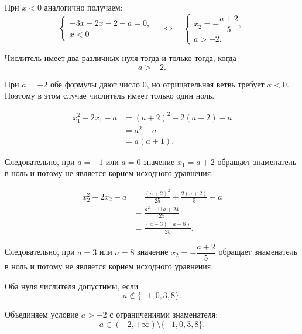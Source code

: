 При \(x<0\) аналогично получаем:
\[
  \begin{cases}
    -3x-2x-2-a=0,\\
    x<0
  \end{cases}
  \quad\Longleftrightarrow\quad
  \begin{cases}
    x_2=-\dfrac{a+2}{5},\\
    a>-2.
  \end{cases}
\]

\begin{conclusionbox}
  Числитель имеет два различных нуля тогда и только тогда, когда
  \[
    \boxed{a>-2}.
  \]
\end{conclusionbox}

\begin{notebox}
  При \(a=-2\) обе формулы дают число \(0\), но отрицательная ветвь требует
  \(x<0\). Поэтому в этом случае числитель имеет только один ноль.
\end{notebox}


\begin{align*}
  x_1^2-2x_1-a
  &=(a+2)^2-2(a+2)-a\\
  &=a^2+a\\
  &=a(a+1).
\end{align*}

Следовательно, при \(a=-1\) или \(a=0\) значение
\(x_1=a+2\) обращает знаменатель в ноль и потому не является корнем
исходного уравнения.


\begin{align*}
  x_2^2-2x_2-a
  &=\frac{(a+2)^2}{25}+\frac{2(a+2)}{5}-a\\
  &=\frac{a^2-11a+24}{25}\\
  &=\frac{(a-3)(a-8)}{25}.
\end{align*}

Следовательно, при \(a=3\) или \(a=8\) значение
\(x_2=-\dfrac{a+2}{5}\) обращает знаменатель в ноль и потому не является
корнем исходного уравнения.

\begin{conclusionbox}
  Оба нуля числителя допустимы, если
  \[
    a\notin\{-1,0,3,8\}.
  \]
\end{conclusionbox}

\begin{resultbox}
  Объединяем условие \(a>-2\) с ограничениями знаменателя:
  \[
    \boxed{a\in(-2,+\infty)\setminus\{-1,0,3,8\}}.
  \]
\end{resultbox}


